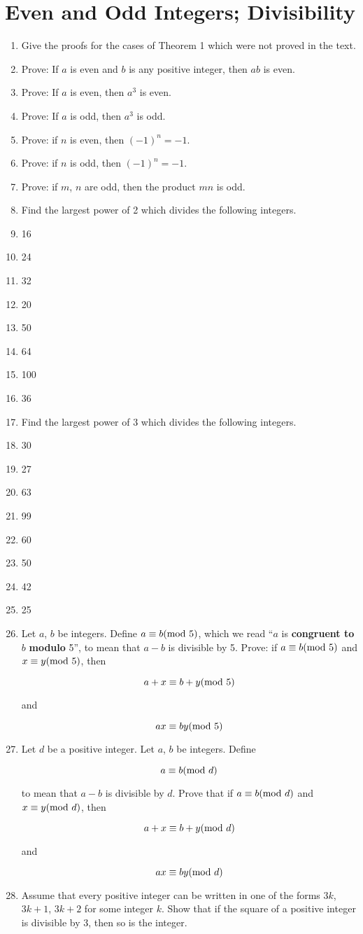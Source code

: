 \documentclass{report}
\def\MLine#1{\par\hspace*{-\leftmargin}\parbox{\textwidth}{\[#1\]}}
\begin{document}
\section{Even and Odd Integers; Divisibility}
\begin{enumerate}
	\item Give the proofs for the cases of Theorem 1 which were not proved in the text.
	\item Prove: If $a$ is even and $b$ is any positive integer, then $ab$ is even.
	\item Prove: If $a$ is even, then $a^3$ is even.
	\item Prove: If $a$ is odd, then $a^3$ is odd.
	\item Prove: if $n$ is even, then $(-1)^n = -1$.
	\item Prove: if $n$ is odd, then $(-1)^n = -1$.
	\item Prove: if $m$, $n$ are odd, then the product $mn$ is odd.
	\item[] Find the largest power of 2 which divides the following integers.
	\item 16
	\item 24 
	\item 32
	\item 20
	\item 50
	\item 64
	\item 100
	\item 36
	\item[] Find the largest power of 3 which divides the following integers.
	\item 30 
	\item 27
	\item 63
	\item 99
	\item 60
	\item 50
	\item 42
	\item 25
	\item Let $a$, $b$ be integers. Define $a \equiv b (\textnormal{mod } 5)$, which we read
		``$a$ is \textbf{congruent to} $b$ \textbf{modulo} 5'', to mean that
		$a - b$ is divisible by 5. Prove: if $a \equiv b (\textnormal{mod } 5)$ and $x \equiv y (\textnormal{mod } 5)$, then
		\MLine{a + x \equiv b + y (\textnormal{mod } 5)}
		and
		\MLine{ax \equiv by (\textnormal{mod } 5)}
	\item Let $d$ be a positive integer. Let $a$, $b$ be integers. Define
		\MLine{a \equiv b (\textnormal{mod } d)}
		to mean that $a - b$ is divisible by $d$. Prove that if $a \equiv b (\textnormal{mod } d)$ and $x \equiv y (\textnormal{mod } d)$, then
		\MLine{a + x \equiv b + y (\textnormal{mod } d)}
		and
		\MLine{ax \equiv by (\textnormal{mod } d)}
	\item Assume that every positive integer can be written in one of the forms $3k$, $3k + 1$, $3k + 2$ for some integer $k$.
		Show that if the square of a positive integer is divisible by 3, then so is the integer.
\end{enumerate}
\end{document}
